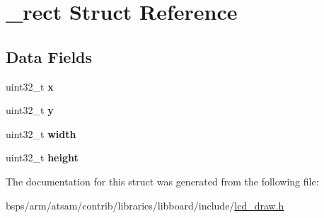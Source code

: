 \hypertarget{struct__rect}{}\section{\+\_\+rect Struct Reference}
\label{struct__rect}
\subsection*{Data Fields}
\begin{DoxyCompactItemize}
\item 
\mbox{\label{struct__rect_a0fa25eee83e4b0f048b15ffe54e0e480}} 
uint32\+\_\+t {\bfseries x}
\item 
\mbox{\label{struct__rect_abf2e4daa2b3de4c216b70d51d313a69b}} 
uint32\+\_\+t {\bfseries y}
\item 
\mbox{\label{struct__rect_a8d3044fb9748d765d0b5bbb362b7e9fc}} 
uint32\+\_\+t {\bfseries width}
\item 
\mbox{\label{struct__rect_a02a04e0f8831cbaa3dd752d6aec7077f}} 
uint32\+\_\+t {\bfseries height}
\end{DoxyCompactItemize}


The documentation for this struct was generated from the following file\+:\begin{DoxyCompactItemize}
\item 
bsps/arm/atsam/contrib/libraries/libboard/include/\mbox{\hyperlink{lcd__draw_8h}{lcd\+\_\+draw.\+h}}\end{DoxyCompactItemize}
